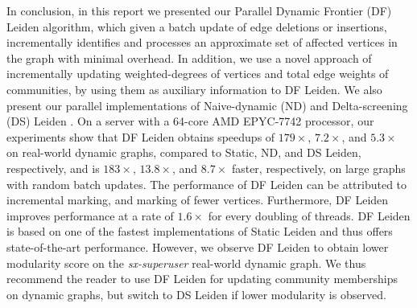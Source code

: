 In conclusion, in this report we presented our Parallel Dynamic Frontier (DF) Leiden algorithm, which given a batch update of edge deletions or insertions, incrementally identifies and processes an approximate set of affected vertices in the graph with minimal overhead. In addition, we use a novel approach of incrementally updating weighted-degrees of vertices and total edge weights of communities, by using them as auxiliary information to DF Leiden. We also present our parallel implementations of Naive-dynamic (ND) \cite{com-aynaud10} and Delta-screening (DS) Leiden \cite{com-zarayeneh21}. On a server with a 64-core AMD EPYC-7742 processor, our experiments show that DF Leiden obtains speedups of $179\times$, $7.2\times$, and $5.3\times$ on real-world dynamic graphs, compared to Static, ND, and DS Leiden, respectively, and is $183\times$, $13.8\times$, and $8.7\times$ faster, respectively, on large graphs with random batch updates. The performance of DF Leiden can be attributed to incremental marking, and marking of fewer vertices. Furthermore, DF Leiden improves performance at a rate of $1.6\times$ for every doubling of threads. DF Leiden is based on one of the fastest implementations of Static Leiden \cite{sahu2023gveleiden} and thus offers state-of-the-art performance. However, we observe DF Leiden to obtain lower modularity score on the \textit{sx-superuser} real-world dynamic graph. We thus recommend the reader to use DF Leiden for updating community memberships on dynamic graphs, but switch to DS Leiden if lower modularity is observed.
